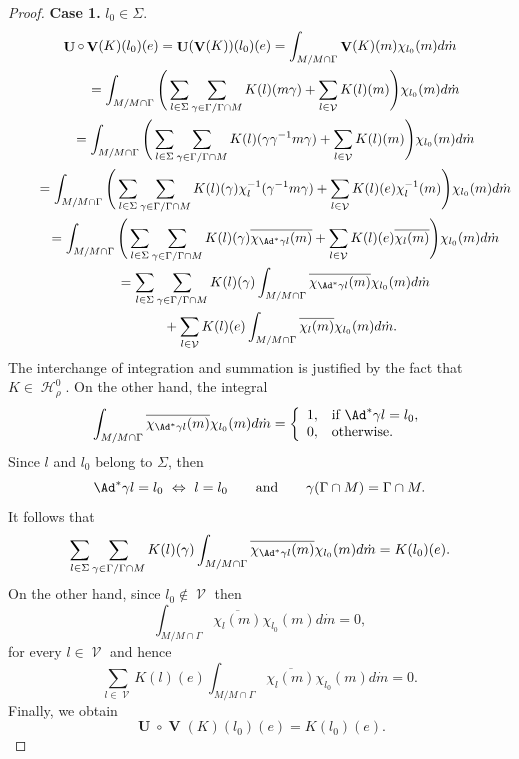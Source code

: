 \documentclass[11pt]{article}
\DeclareMathOperator{\U}{\mathbf{U}}
\DeclareMathOperator{\V}{\mathbf{V}} \DeclareMathOperator{\Aut}{Aut}
\DeclareMathOperator{\nongen}{\mathcal{V}}
\DeclareMathOperator{\Hi}{\mathscr{H}}
\begin{document}
\begin{proof}
\textbf{Case 1.}  $l_0\in \Sigma$.
\begin{gather*}
\U\circ \V(K)(l_0)(e) = \U( \V(K))(l_0)(e)  = \int_{M/M\cap \Gamma} \V(K)(m) \chi_{l_0}(m) d\dot{m}\\
\qquad{} = \int_{M/M\cap \Gamma} \Bigg( \sum_{l\in \Sigma}
\sum_{\gamma\in \Gamma/\Gamma\cap M} K(l)(m\gamma)+ \sum
_{l\in \nongen} K(l) (m)\Bigg)\chi_{l_0}(m) d\dot{m}\\
\qquad{} = \int_{M/M\cap \Gamma} \Bigg( \sum_{l\in \Sigma}
\sum_{\gamma\in \Gamma/\Gamma\cap M} K(l)(\gamma \gamma
^{-1}m\gamma)+ \sum
_{l\in \nongen} K(l) (m)\Bigg)\chi_{l_0}(m) d\dot{m}\\
\qquad{} = \int_{M/M\cap \Gamma} \Bigg( \sum_{l\in \Sigma}
\sum_{\gamma\in \Gamma/\Gamma\cap M} K(l)(\gamma
)\chi_{l}^{-1}(\gamma ^{-1}m\gamma) + \sum
_{l\in \nongen} K(l) (e)\chi_l^{-1}(m)\Bigg)\chi_{l_0}(m) d\dot{m}\\
\qquad{} = \int_{M/M\cap \Gamma} \Bigg( \sum_{l\in \Sigma}
\sum_{\gamma\in \Gamma/\Gamma\cap M} K(l)(\gamma
)\overline{\chi_{\Ad^*\gamma l}(m)} + \sum
_{l\in \nongen} K(l) (e)\overline{\chi_l(m)}\Bigg)\chi_{l_0}(m) d\dot{m}\\
\qquad{} =   \sum_{l\in \Sigma} \sum_{\gamma\in \Gamma/\Gamma\cap M}
K(l)(\gamma )\int_{M/M\cap \Gamma} \overline{\chi_{\Ad^*\gamma
l}(m)}\chi_{l_0}(m) d\dot{m} \\
\qquad\quad{} + \sum _{l\in \nongen} K(l) (e)
\int_{M/M\cap \Gamma} \overline{\chi_l(m)}\chi_{l_0}(m) d\dot{m}.
\end{gather*}
The interchange of integration and summation is justif\/ied by the
fact that $K\in \Hi^0_\rho$. On the other hand, the integral
\[
\int_{M/M\cap \Gamma}
\overline{\chi_{\Ad^*\gamma l}(m)} \chi_{l_0}(m) d\dot{m} = \left\{
  \begin{array}{ll}
    1, & \hbox{if} \ \Ad^*\gamma l = l_0, \\
    0, & \hbox{otherwise.}
  \end{array}
\right.
\]
Since $l$ and $l_0$ belong to $\Sigma$, then
\[
\Ad^*\gamma l= l_0 \ \Leftrightarrow \ l = l_{0}\qquad \mbox{and} \qquad
\gamma(\Gamma\cap M)= \Gamma\cap M.
\] It follows that
\[
\sum_{l\in \Sigma} \sum_{\gamma\in \Gamma/\Gamma\cap M}
K(l)(\gamma )\int_{M/M\cap \Gamma} \overline{\chi_{\Ad^*\gamma
l}(m)}\chi_{l_0}(m) d\dot{m}=K(l_0)(e).
\] On the other hand, since
$l_0\not\in \nongen$ then
\[
\int_{M/M\cap \Gamma}
\overline{\chi_l(m)}\chi_{l_0}(m) d\dot{m}=0,
\] for every $l\in
\nongen$ and hence
\[
\sum _{l\in \nongen} K(l) (e)
\int_{M/M\cap \Gamma} \overline{\chi_l(m)}\chi_{l_0}(m)
d\dot{m}=0.
\] Finally, we obtain
\[
\U\circ \V(K)(l_0)(e)= K(l_0)(e).
\]





\end{proof}
\end{document}
